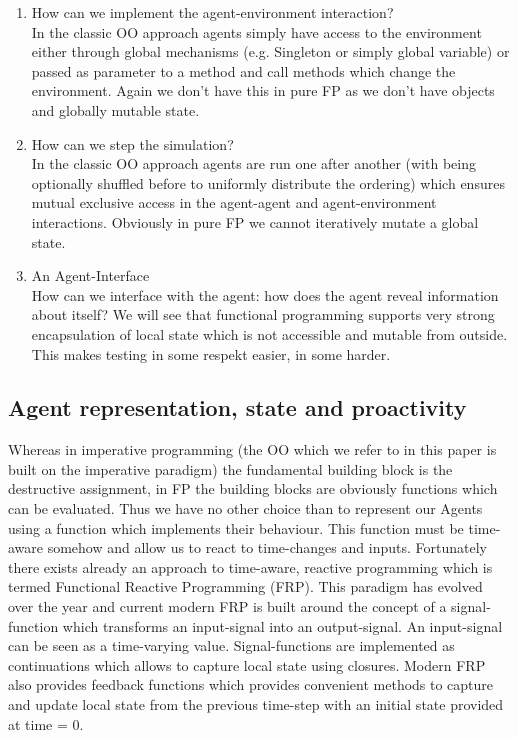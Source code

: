 \begin{enumerate}
	\item How can we implement the agent-environment interaction? \\
	In the classic OO approach agents simply have access to the environment either through global mechanisms (e.g. Singleton or simply global variable) or passed as parameter to a method and call methods which change the environment. Again we don't have this in pure FP as we don't have objects and globally mutable state.
	
	\item How can we step the simulation? \\
	In the classic OO approach agents are run one after another (with being optionally shuffled before to uniformly distribute the ordering) which ensures mutual exclusive access in the agent-agent and agent-environment interactions. Obviously in pure FP we cannot iteratively mutate a global state.

	\item An Agent-Interface \\
	How can we interface with the agent: how does the agent reveal information about itself? We will see that functional programming supports very strong encapsulation of local state which is not accessible and mutable from outside. This makes testing in some respekt easier, in some harder. 
\end{enumerate}

\subsection{Agent representation, state and proactivity}
Whereas in imperative programming (the OO which we refer to in this paper is built on the imperative paradigm) the fundamental building block is the destructive assignment, in FP the building blocks are obviously functions which can be evaluated.
Thus we have no other choice than to represent our Agents using a function which implements their behaviour. This function must be time-aware somehow and allow us to react to time-changes and inputs. Fortunately there exists already an approach to time-aware, reactive programming which is termed Functional Reactive Programming (FRP). This paradigm has evolved over the year and current modern FRP is built around the concept of a signal-function which transforms an input-signal into an output-signal. An input-signal can be seen as a time-varying value. Signal-functions are implemented as continuations which allows to capture local state using closures. Modern FRP also provides feedback functions which provides convenient methods to capture and update local state from the previous time-step with an initial state provided at time = 0.

